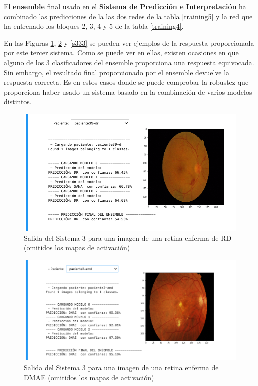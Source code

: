 \documentclass[
  12pt,
  spanish,
  a4paperpaper,
]{report}
\begin{document}
El \textbf{ensemble} final usado en el \textbf{Sistema de Predicción e
Interpretación} ha combinado las predicciones de la las dos redes de la
tabla \ref{training5} y la red que ha entrenado los bloques 2, 3, 4 y 5
de la tabla \ref{training4}.

En las Figuras \ref{s331}, \ref{s332} y \ref{s333} se pueden ver
ejemplos de la respuesta proporcionada por este tercer sistema. Como se
puede ver en ellas, existen ocasiones en que alguno de los 3
clasificadores del ensemble proporciona una respuesta equivocada. Sin
embargo, el resultado final proporcionado por el ensemble devuelve la
respuesta correcta. Es en estos casos donde se puede comprobar la
robustez que proporciona haber usado un sistema basado en la combinación
de varios modelos distintos.

\begin{figure}
\centering
\includegraphics[width=1\textwidth,height=\textheight]{source/figures/s331.png}
\caption{Salida del Sistema 3 para una imagen de una retina enferma de
RD (omitidos los mapas de activación) \label{s331}}
\end{figure}

\begin{figure}
\centering
\includegraphics[width=1\textwidth,height=\textheight]{source/figures/s332.png}
\caption{Salida del Sistema 3 para una imagen de una retina enferma de
DMAE (omitidos los mapas de activación) \label{s332}}
\end{figure}
\end{document}
